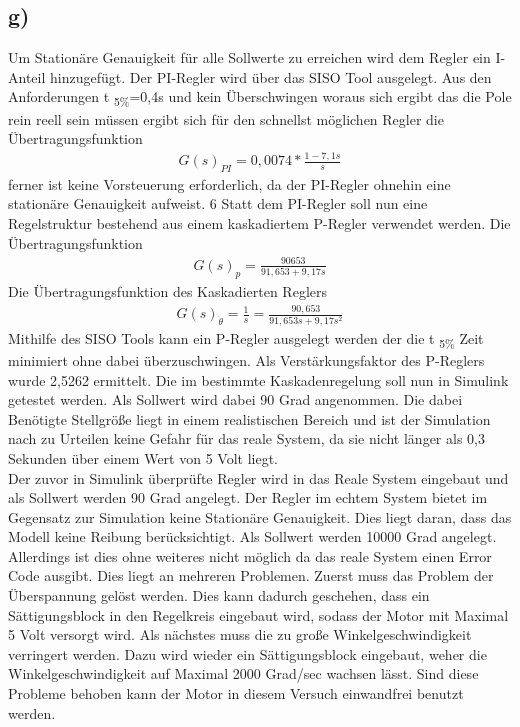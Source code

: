 \documentclass[10pt]{scrartcl}
\begin{document}
\subsection{g)}	Um Stationäre Genauigkeit für alle Sollwerte zu erreichen wird dem Regler ein I-Anteil hinzugefügt. Der PI-Regler wird über das SISO Tool ausgelegt. Aus den Anforderungen t \textsubscript{5\%}=0,4s und kein Überschwingen woraus sich ergibt das die Pole rein reell sein müssen ergibt sich für den schnellst möglichen Regler die Übertragungsfunktion
\begin{align}
   G(s)_{PI}=0,0074*\frac{1-7,1s}{s}
\end{align} 
ferner ist keine Vorsteuerung erforderlich, da der PI-Regler ohnehin eine stationäre Genauigkeit aufweist. 
6
	Statt dem PI-Regler soll nun eine Regelstruktur bestehend aus einem kaskadiertem P-Regler verwendet werden. Die Übertragungsfunktion 
\begin{align}
   G(s)_{p}=\frac{90653}{91,653+9,17s}
\end{align} 
	Die Übertragungsfunktion des Kaskadierten Reglers 
\begin{align}
G(s)_{ \dot{\theta}}=\frac{1}{s} = \frac{90,653}{91,653s+9,17s^2}
\end{align}
Mithilfe des SISO Tools kann ein P-Regler ausgelegt werden der die t \textsubscript{5\%} Zeit minimiert ohne dabei überzuschwingen. 
	Als Verstärkungsfaktor des P-Reglers wurde 2,5262 ermittelt.
	Die im bestimmte Kaskadenregelung soll nun in Simulink getestet werden. Als Sollwert wird dabei 90 Grad angenommen. Die dabei Benötigte Stellgröße liegt in einem realistischen Bereich und ist der Simulation nach zu Urteilen keine Gefahr für das reale System, da sie nicht länger als 0,3 Sekunden über einem Wert von 5 Volt liegt.\\
	Der zuvor in Simulink überprüfte Regler wird in das Reale System eingebaut und als Sollwert werden 90 Grad angelegt. Der Regler im echtem System bietet im Gegensatz zur Simulation keine Stationäre Genauigkeit. Dies liegt daran, dass das Modell keine Reibung berücksichtigt.
	Als Sollwert werden 10000 Grad angelegt.
 Allerdings ist dies ohne weiteres nicht möglich da das reale System einen Error Code ausgibt. 
Dies liegt an mehreren Problemen.
	Zuerst muss das Problem der Überspannung gelöst werden. Dies kann dadurch geschehen, dass ein Sättigungsblock in den Regelkreis eingebaut wird, sodass der Motor mit Maximal 5 Volt versorgt wird. Als nächstes muss die zu große Winkelgeschwindigkeit verringert werden. Dazu wird wieder ein Sättigungsblock eingebaut, weher die Winkelgeschwindigkeit auf Maximal 2000 Grad/sec wachsen lässt. Sind diese Probleme behoben kann der Motor in diesem Versuch einwandfrei benutzt werden. 
\end{document}
